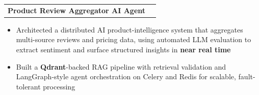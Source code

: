 \documentclass[10pt, letterpaper]{article}
\newenvironment{highlights}{
    \begin{itemize}[
        topsep=0.06 cm,
        parsep=0.06 cm,
        partopsep=0pt,
        itemsep=0pt,
        leftmargin=0 cm + 10pt
    ]
}{
    \end{itemize}
}
\newenvironment{onecolentry}{
    \par\noindent
}{
    \par
}
\begin{document}
\begin{tabularx}{\textwidth}{@{}Xr@{}}
    \textbf{Product Review Aggregator AI Agent}\\
\end{tabularx}
\vspace{-4.5mm}
\begin{onecolentry}
    \begin{highlights}
        



\item[--] Architected a distributed AI product-intelligence system that aggregates multi-source reviews and pricing data, using automated LLM evaluation to extract sentiment and surface structured insights in \textbf{near real time}
\item[--] Built a \textbf{Qdrant}-backed RAG pipeline with retrieval validation and LangGraph-style agent orchestration on Celery and Redis for scalable, fault-tolerant processing

    \end{highlights}
\end{onecolentry}
\end{document}
